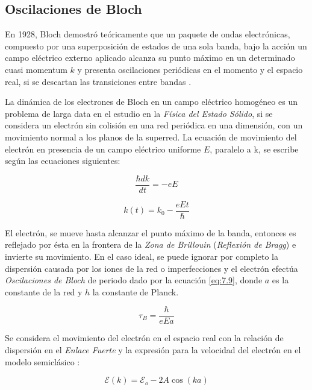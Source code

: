 \subsection{Oscilaciones de Bloch}\label{cap:7.2}

En 1928, Bloch demostró teóricamente que un paquete de ondas electrónicas, compuesto por una superposición de estados de una sola banda, bajo la acción un campo eléctrico externo aplicado alcanza su punto máximo en un determinado cuasi momentum $k$ y presenta oscilaciones periódicas en el momento y el espacio real, si se descartan las transiciones entre bandas \cite{Shah}.

La dinámica de los electrones de Bloch en un campo eléctrico homogéneo es un problema de larga data en el estudio en la \textit{Física del Estado Sólido}, si se considera un electrón sin colisión en una red periódica en una dimensión, con un movimiento normal a los planos de la superred. La ecuación de movimiento del electrón en presencia de un campo eléctrico uniforme $E$, paralelo a k, se escribe según las ecuaciones siguientes: 

\begin{equation}\label{eq:7.8}
    \frac{\hbar dk}{dt} = -eE
\end{equation}

\begin{equation}\label{eq:7.9}
    k(t)=k_0-\frac{eEt}{\hbar} 
\end{equation}

El electrón, se mueve hasta alcanzar el punto máximo de la banda, entonces es reflejado por ésta en la frontera de la \textit{Zona de Brillouin} (\textit{Reflexión de Bragg}) e invierte su movimiento. En el caso ideal, se puede ignorar por completo la dispersión causada por los iones de la red o imperfecciones y el electrón efectúa \textit{Oscilaciones de Bloch} de periodo dado por la ecuación \ref{eq:7.9}, donde $a$ es la constante de la red y $h$ la constante de Planck.

\begin{equation}\label{eq:7.10}
    \tau_B=\frac{\hbar}{eEa}
\end{equation}

Se considera el movimiento del electrón en el espacio real con la relación de dispersión en el \textit{Enlace Fuerte} y la expresión para la velocidad del electrón en el modelo semiclásico \cite{kittel}:

\begin{equation}\label{eq:7.11}
\mathcal{E}(k)=\mathcal{E}_o-2A\cos(ka)   
\end{equation}

